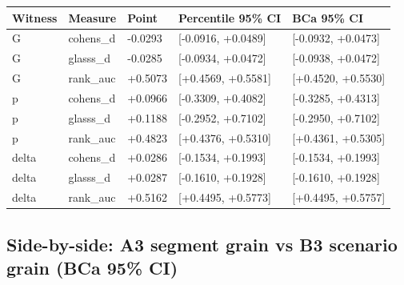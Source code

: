 \documentclass[
  11pt,
]{article}
\newcounter{none} %
\begin{document}
{\def\LTcaptype{none} %
\begin{longtable}[]{@{}lllll@{}}
\toprule\noalign{}
Witness & Measure & Point & Percentile 95\% CI & BCa 95\% CI \\
\midrule\noalign{}
\endhead
\bottomrule\noalign{}
\endlastfoot
G & cohens\_d & -0.0293 & {[}-0.0916, +0.0489{]} & {[}-0.0932,
+0.0473{]} \\
G & glasss\_d & -0.0285 & {[}-0.0934, +0.0472{]} & {[}-0.0938,
+0.0472{]} \\
G & rank\_auc & +0.5073 & {[}+0.4569, +0.5581{]} & {[}+0.4520,
+0.5530{]} \\
p & cohens\_d & +0.0966 & {[}-0.3309, +0.4082{]} & {[}-0.3285,
+0.4313{]} \\
p & glasss\_d & +0.1188 & {[}-0.2952, +0.7102{]} & {[}-0.2950,
+0.7102{]} \\
p & rank\_auc & +0.4823 & {[}+0.4376, +0.5310{]} & {[}+0.4361,
+0.5305{]} \\
delta & cohens\_d & +0.0286 & {[}-0.1534, +0.1993{]} & {[}-0.1534,
+0.1993{]} \\
delta & glasss\_d & +0.0287 & {[}-0.1610, +0.1928{]} & {[}-0.1610,
+0.1928{]} \\
delta & rank\_auc & +0.5162 & {[}+0.4495, +0.5773{]} & {[}+0.4495,
+0.5757{]} \\
\end{longtable}
}

\subsection{Side-by-side: A3 segment grain vs B3 scenario grain (BCa
95\%
CI)}\label{side-by-side-a3-segment-grain-vs-b3-scenario-grain-bca-95-ci}
\end{document}
